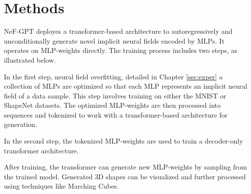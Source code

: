 \section{Methods}

NeF-GPT deployes a transformer-based architecture to autoregressively and unconditionally generate novel implicit neural fields encoded by MLPs. It operates on MLP-weights directly. The training process includes two steps, as illustrated below.

In the first step, neural field overfitting, detailed in Chapter \ref{sec:exper} a collection of MLPs are optimized so that each MLP represents an implicit neural field of a data sample. This step involves training on either the MNIST or ShapeNet datasets. The optimized MLP-weights are then processed into sequences and tokenized to work with a transformer-based architecture for generation.

In the second step, the tokenized MLP-weights are used to train a decoder-only transformer architecture.

After training, the transformer can generate new MLP-weights by sampling from the trained model. Generated 3D shapes can be visualized and further processed using techniques like Marching Cubes.